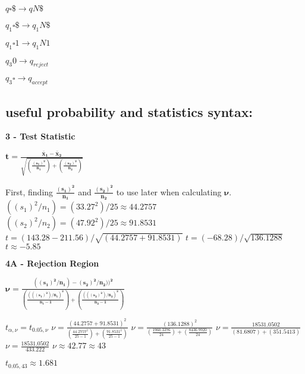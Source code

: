 \documentclass[12pt, letterpaper]{article}
\begin{document}
$ q \square\$ \rightarrow qN \$ $

$ q_1 \square\$ \rightarrow q_1 N\$ $

$ q_1 \square1 \rightarrow q_1 N1 $

$ q_3 0 \rightarrow q_{reject} $

$ q_3\square \rightarrow q_{accept} $

\subsection{useful probability and statistics syntax:}

\textbf{3 - Test Statistic}
\vskip 12pt

\begin{center}
$ \mathbf{t = \frac{\bar{x}_1 - \bar{x}_2}{\sqrt{(\frac{(s_1)^2}{n_1}) + (\frac{(s_2)^2}{n_2})}} }$
\end{center}


First, finding $ \mathbf{\frac{(s_1)^2}{n_1}} $ and $ \mathbf{\frac{(s_2)^2}{n_2}} $ to use later when calculating $ \mathbf{\nu} $.
\vskip 9pt
$ ((s_1)^2/n_1) = (33.27^2)/25 \approx 44.2757 $
\vskip 9pt
$ ((s_2)^2/n_2) = (47.92^2)/25 \approx 91.8531 $
\vskip 9pt
$ t = (143.28 - 211.56)/\sqrt{(44.2757 + 91.8531)} $
\vskip 9pt
$ t = (-68.28)/\sqrt{136.1288} $
\vskip 9pt
$ t \approx -5.85 $

\vskip 12pt
\textbf{4A - Rejection Region}

\begin{center}
$ \mathbf{\nu = \frac{((s_1)^2/n_1)-(s_2)^2/n_2))^2}{(\frac{(((s_1)^2)/n_1)^2}{n_1-1})+(\frac{(((s_2)^2)/n_2)^2}{n_2-1})}} $
\end{center}
$ t_{\alpha,\nu} = t_{0.05, \nu} $
\vskip 9pt
$ \nu = \frac{(44.2757+91.8531)^2}{(\frac{44.2757^2}{25-1})+(\frac{91.8531^2}{25-1})} $
\vskip 9pt
$ \nu = \frac{(136.1288)^2}{(\frac{1960.3376}{24})+(\frac{8436.9920}{24})} $
\vskip 9pt
$ \nu = \frac{18531.0502}{(81.6807)+(351.5413)} $
\vskip 9pt
$ \nu = \frac{18531.0502}{433.222} $
\vskip 9pt
$ \nu \approx 42.77 \approx 43 $

\vskip 12pt
$ t_{0.05, 43} \approx 1.681 $
\end{document}

